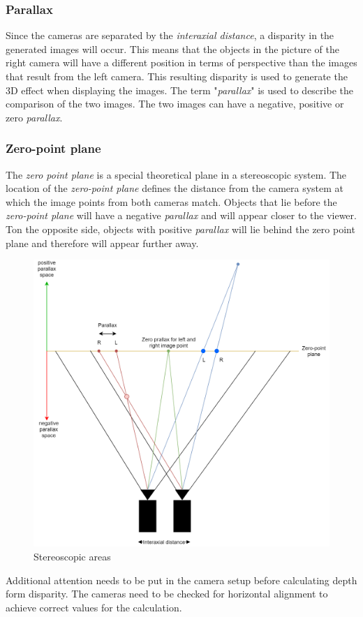 \subsubsection{Parallax}
Since the cameras are  separated by the \textit{interaxial distance}, a disparity in the generated images will occur. This means that the objects in the picture of the right camera will have a different position in terms of perspective than the images that result from the left camera. This resulting disparity is used to generate the 3D effect when displaying the images. The term "\textit{parallax}" is used to describe the comparison of the two images. The two images can have a negative, positive or zero \textit{parallax}.

\subsubsection{Zero-point plane}
The\textit{ zero point plane} is a special theoretical plane in a stereoscopic system. The location of the \textit{zero-point plane} defines the distance from the camera system at which the image points from both cameras match. Objects that lie before the \textit{zero-point plane} will have a negative \textit{parallax} and will appear closer to the viewer. Ton the opposite side, objects with positive \textit{parallax} will lie behind the zero point plane and therefore will appear further away.

\begin{figure}[H]
\includegraphics[width=\textwidth]{images/Stereo_diagram.png}
\caption{Stereoscopic areas}
\label{stereo_diagram} 
\end{figure}
Additional attention needs to be put in the camera setup before calculating depth form disparity. The cameras need to be checked for horizontal alignment to achieve correct values for the calculation.
